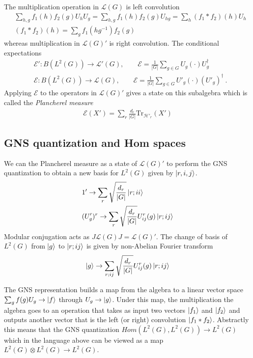 \documentclass{article}
\newcommand{\mH}{\mathcal{H}}
\newcommand{\nn}{\nonumber}
\theoremstyle{definition}
\begin{document}
The multiplication operation in $\mathcal{L}(G)$ is left convolution
\begin{align}
    &\sum_{h,g} f_1(h) f_2(g) U_h U_g=\sum_{h,g} f_1(h) f_2(g) U_{h g}=\sum_h (f_1*f_2)(h) U_h\nn\\
    &(f_1*f_2)(h)=\sum_g f_1(h g^{-1})f_2(g)
\end{align}
whereas multiplication in $\mathcal{L}(G)'$ is right convolution. 
The conditional expectations
\begin{align}
 &\mathcal{E}':B(L^2(G))\to \mathcal{L}'(G),\qquad \mathcal{E}=\frac{1}{|G|}\sum_{g\in G} U_g(\cdot ) U_g^\dagger   \nn\\
 &\mathcal{E}:B(L^2(G))\to \mathcal{L}(G),\qquad \mathcal{E}=\frac{1}{|G|}\sum_{g\in G} U'_g(\cdot ) (U'_g)^\dagger   \ .
\end{align}
Applying $\mathcal{E}$ to the operators in $\mathcal{L}(G)'$ gives a state on this subalgebra which is called the {\it Plancherel measure}
\begin{align}
    \mathcal{E}(X')=\sum_r \frac{d_r}{|G|}\text{Tr}_{\mH'_r}(X')
\end{align}


\subsection{GNS quantization and Hom spaces}

We can the Plancherel measure as a state of $\mathcal{L}(G)'$ to perform the GNS quantization to obtain a new basis for $L^2(G)$ given by $\ket{r,i,j}$.
\begin{align}
    &1'\to \sum_r \sqrt{\frac{d_r}{|G|}} \ket{r; ii}\nn\\
    &(U'_g)^r\to \sum_r \sqrt{\frac{d_r}{|G|}} U^r_{ij}(g)\ket{r; ij}
\end{align}
Modular conjugation acts as $J\mathcal{L}(G)J=\mathcal{L}(G)'$. 
The change of basis of $L^2(G)$ from $\ket{g}$ to $\ket{r;ij}$ is given by non-Abelian Fourier transform
\begin{align}
    \ket{g}\to \sum_{r;ij}\sqrt{\frac{d_r}{|G|}}U^r_{ij}(g)\ket{r;ij}
\end{align}

The GNS representation builds a map from the algebra to a linear vector space $\sum_g f(g) U_g\to \ket{f}$ through $U_g\to \ket{g}$. Under this map, the multiplication the algebra goes to an operation that takes as input two vectors $\ket{f_1}$ and $\ket{f_2}$ and outputs another vector that is the left (or right) convolution $\ket{f_1*f_2}$. Abstractly this means that the GNS quantization $Hom(L^2(G),L^2(G))\to L^2(G)$ which in the language above can be viewed as a map $L^2(G)\otimes L^2(G)\to L^2(G)$.
\end{document}
